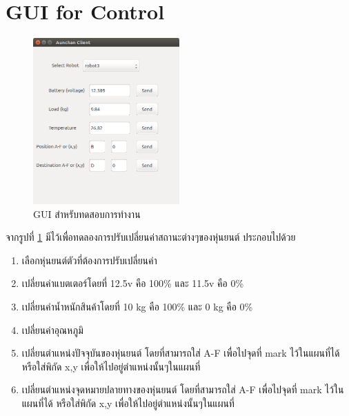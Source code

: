 \documentclass{classes/fiboreport}
\begin{document}
\clearpage
\section{GUI for Control}
\begin{figure}[!ht]
	\centering
	\includegraphics[width=0.5\textwidth]{images/test_gui.png}
	\caption{GUI สำหรับทดสอบการทำงาน}
	\label{fig:test_gui}
\end{figure}

จากรูปที่ \ref{fig:test_gui} มีไว้เพื่อทดลองการปรับเปลี่ยนค่าสถานะต่างๆของหุ่นยนต์ ประกอบไปด้วย
\begin{enumerate}[label=\arabic*, leftmargin=1.5cm]
	\item เลือกหุ่นยนต์ตัวที่ต้องการปรับเปลี่ยนค่า
	\item เปลี่ยนค่าแบตเตอร์โดยที่ 12.5v คือ 100\% และ 11.5v คือ 0\%
	\item เปลี่ยนค่าน้ำหนักสินค้าโดยที่ 10 kg คือ 100\% และ 0 kg คือ 0\%
	\item เปลี่ยนค่าอุณหภูมิ
	\item เปลี่ยนตำแหน่งปัจจุบันของหุ่นยนต์ โดยที่สามารถใส่ A-F เพื่อไปจุดที่ mark ไว้ในแผนที่ได้
	หรือใส่พิกัด x,y เพื่อให้ไปอยู่ตำแหน่งนั้นๆในแผนที่
	\item เปลี่ยนตำแหน่งจุดหมายปลายทางของหุ่นยนต์ โดยที่สามารถใส่ A-F เพื่อไปจุดที่ mark ไว้ในแผนที่ได้
	หรือใส่พิกัด x,y เพื่อให้ไปอยู่ตำแหน่งนั้นๆในแผนที่
\end{enumerate}

\clearpage
\end{document}

